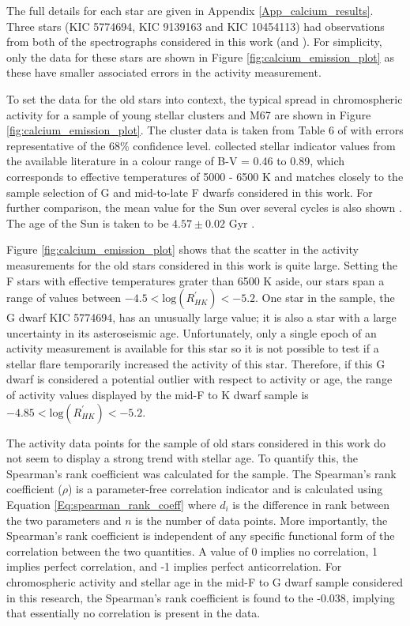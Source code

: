 The full details for each star are given in Appendix \ref{App_calcium_results}. Three stars (KIC 5774694, KIC 9139163 and KIC 10454113) had observations from both of the spectrographs considered in this work (\esp and \narval). For simplicity, only the \narval data for these stars are shown in Figure \ref{fig:calcium_emission_plot} as these have smaller associated errors in the activity measurement. 

To set the data for the old stars into context, the typical spread in chromospheric activity for a sample of young stellar clusters and M67 are shown in Figure \ref{fig:calcium_emission_plot}. The cluster data is taken from Table 6 of \citet{Mamajek_Hillenbrand_2008} with errors representative of the 68\% confidence level. \citet{Mamajek_Hillenbrand_2008} collected stellar \Rprime indicator values from the available literature in a colour range of B-V = 0.46 to 0.89, which corresponds to effective temperatures of 5000 - 6500 K and matches closely to the sample selection of G and mid-to-late F dwarfs considered in this work. For further comparison, the mean \Rprime value for the Sun over several cycles is also shown \citep{Egeland_etal_2017}. The age of the Sun is taken to be $4.57 \pm 0.02$ Gyr \citep{Bahcall_etal_1995}.

Figure \ref{fig:calcium_emission_plot} shows that the scatter in the \Rprime activity measurements for the old stars considered in this work is quite large. Setting the F stars with effective temperatures grater than 6500 K aside, our stars span a range of \Rprime values between $-4.5<\mathrm{log}(R^{'}_{HK})<-5.2$. One star in the sample, the G dwarf KIC 5774694, has an unusually large \Rprime value; it is also a star with a large uncertainty in its asteroseismic age. Unfortunately, only a single epoch of an activity measurement is available for this star so it is not possible to test if a stellar flare temporarily increased the activity of this star. Therefore, if this G dwarf is considered a potential outlier with respect to activity or age, the range of activity values displayed by the mid-F to K dwarf sample is $-4.85<\mathrm{log}(R^{'}_{HK})<-5.2$.

The activity data points for the sample of old stars considered in this work do not seem to display a strong trend with stellar age. To quantify this, the Spearman's rank coefficient was calculated for the sample. The Spearman's rank coefficient ($\rho$) is a parameter-free correlation indicator and is calculated using Equation \ref{Eq:spearman_rank_coeff} where $d_{i}$ is the difference in rank between the two parameters and $n$ is the number of data points. More importantly, the Spearman's rank coefficient is independent of any specific functional form of the correlation between the two quantities. A value of 0 implies no correlation, 1 implies perfect correlation, and -1 implies perfect anticorrelation. For chromospheric activity and stellar age in the mid-F to G dwarf sample considered in this research, the Spearman's rank coefficient is found to the -$0.038$, implying that essentially no correlation is present in the data.

